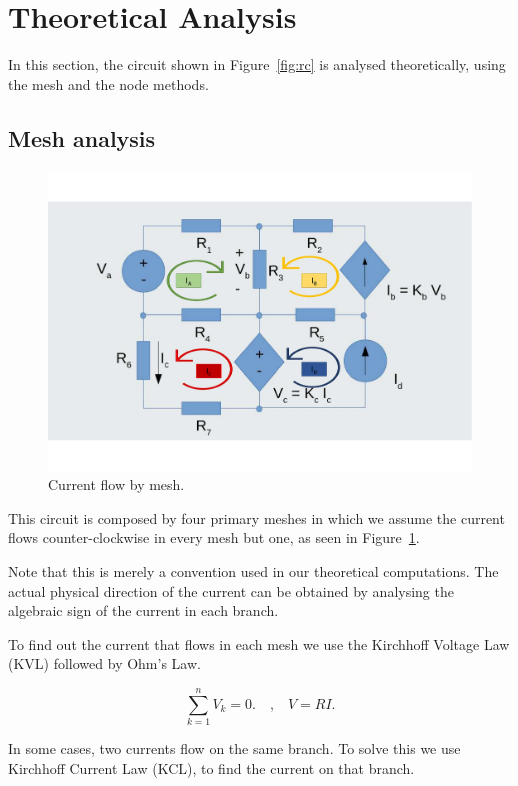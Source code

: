 \section{Theoretical Analysis}
\label{sec:analysis}
\indent

In this section, the circuit shown in Figure~\ref{fig:rc} is analysed
theoretically, using the mesh and the node methods. 

\subsection{Mesh analysis}
\begin{figure}[H] \centering
    \includegraphics[width=0.8\linewidth]{Images/mesh analysis.pdf}
    \caption{Current flow by mesh.}
    \label{fig:Currents}
\end{figure}


\indent

This circuit is composed by four primary meshes in which we assume the current flows counter-clockwise in every mesh but one, as seen in Figure~\ref{fig:Currents}.

Note that this is merely a convention used in our theoretical computations. The actual physical direction of the current can be obtained by analysing the algebraic sign of the current in each branch. 

To find out the current that flows in each mesh we use the Kirchhoff Voltage Law (KVL) followed by Ohm's Law. 

\begin{equation}
    \sum_{k=1}^{n} V_k = 0.
    \quad\text{,}\quad 
    V=RI.
\end{equation}

In some cases, two currents flow on the same branch. To solve this we use  Kirchhoff Current Law (KCL), to find the current on that branch.

